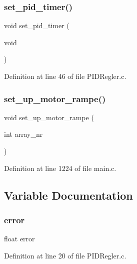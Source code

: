 \mbox{\label{_p_i_d_regler_8c_a2382b3ca034b5ad08977cfa64bcff513}} 
\subsubsection{set\+\_\+pid\+\_\+timer()}
{\footnotesize\ttfamily void set\+\_\+pid\+\_\+timer (\begin{DoxyParamCaption}\item[{void}]{ }\end{DoxyParamCaption})}



Definition at line 46 of file P\+I\+D\+Regler.\+c.

\mbox{\label{_p_i_d_regler_8c_a9e44ea949ee3e5408d38f79758c8ea48}} 
\subsubsection{set\+\_\+up\+\_\+motor\+\_\+rampe()}
{\footnotesize\ttfamily void set\+\_\+up\+\_\+motor\+\_\+rampe (\begin{DoxyParamCaption}\item[{int}]{array\+\_\+nr }\end{DoxyParamCaption})}



Definition at line 1224 of file main.\+c.



\subsection{Variable Documentation}
\mbox{\label{_p_i_d_regler_8c_a7cfd13d282af770aaa971755fa092fca}} 
\subsubsection{error}
{\footnotesize\ttfamily float error}



Definition at line 20 of file P\+I\+D\+Regler.\+c.

